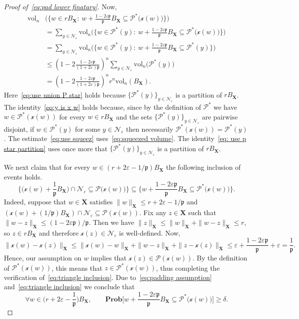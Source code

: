 \documentclass[11pt,reqno]{amsart}
\renewcommand{\le}{\leqslant}
\renewcommand{\ge}{\geqslant}
\renewcommand{\d}{\delta}
\newcommand{\X}{\mathbf X}
\newcommand{\e}{\varepsilon}
\theoremstyle{remark}
\renewcommand{\subset}{\subseteq}
\renewcommand{\Pr}{\mathbf{Prob}}
\newcommand{\vol}{\mathrm{vol}}
\renewcommand{\1}{\mathbf 1}
\newcommand{\Part}{\mathscr{P}}
\newcommand{\p}{\mathfrak{p}}
\newcommand{\cx}{\mathcal{x}}
\begin{document}
\begin{proof}[Proof of~\eqref{eq:pad lower finatary}]
Now,
\begin{align}
\vol_n&\Big(\Big\{w\in rB_{\X}:\ w+\frac{1-2\e{\mathfrak{p}}}{{\mathfrak{p}}}B_{\X}\subset \Part^*\big(\cx(w)\big)\Big\}\Big)\nonumber \\&=\sum_{y\in \mathcal{N}_\e}\vol_n\Big(\Big\{w\in \Part^*(y):\ w+\frac{1-2\e{\mathfrak{p}}}{{\mathfrak{p}}}B_{\X}\subset \Part^*\big(\cx(w)\big)\Big\}\Big)\label{eq:use union P star}\\
&=\sum_{y\in \mathcal{N}_\e}\vol_n\Big(\Big\{w\in \Part^*(y):\ w+\frac{1-2\e{\mathfrak{p}}}{{\mathfrak{p}}}B_{\X}\subset \Part^*(y)\Big\}\Big)\label{eq:y is x w}\\
&\le \left(1-2\frac{1-2\e{\mathfrak{p}}}{(1+2\e){\mathfrak{p}}}\right)^n\sum_{y\in \mathcal{N}_\e}\vol_n\big(\Part^*(y)\big)\label{eq:use squeez}\\
&=\left(1-2\frac{1-2\e{\mathfrak{p}}}{(1+2\e){\mathfrak{p}}}\right)^nr^n\vol_n(B_{\X}).\label{eq: use p star partition}
\end{align}
Here~\eqref{eq:use union P star} holds because  $\{\Part^*(y)\}_{y\in \mathcal{N}_\e}$ is a partition of $rB_{\X}$. The identity~\eqref{eq:y is x w} holds because, since by the definition of $\Part^*$ we have $w\in \Part^*(\cx(w))$ for every $w\in rB_{\X}$ and the sets $\{\Part^*(y)\}_{y\in \mathcal{N}_\e}$ are pairwise disjoint, if $w\in \Part^*(y)$ for some $y\in \mathcal{N}_\e$ then necessarily $\Part^*(\cx(w))=\Part^*(y)$. The estimate~\eqref{eq:use squeez} uses~\eqref{eq:squeezed volume}. The identity~\eqref{eq: use p star partition}  uses once more that  $\{\Part^*(y)\}_{y\in \mathcal{N}_\e}$ is a partition of $rB_{\X}$.

We next claim that for every $w\in (r+2\e-1/\p)B_{\X}$ the following inclusion of events holds.
\begin{equation}\label{eq:triangle inclusion}
 \bigg\{\Big(\cx(w)+\frac{1}{{\mathfrak{p}}}B_{\X}\Big)\cap \mathcal{N}_\e \subset\mathscr{P}\big(\cx(w)\big)\bigg\}\subset \bigg\{w+\frac{1-2\e{\mathfrak{p}}}{{\mathfrak{p}}}B_{\X}\subset \Part^*\big(\cx(w)\big)\bigg\}.
\end{equation}
Indeed, suppose that $w\in \X$ satisfies $\|w\|_{\X}\le r+2\e-1/{\mathfrak{p}}$ and $(\cx(w)+(1/\p)B_{\X})\cap \mathcal{N}_\e \subset\mathscr{P}(\cx(w))$. Fix any $z \in \X$ such that $\|w-z \|_{\X}\le (1-2\e\p)/\p$. Then we have $\|z \|_{\X}\le \|w\|_{\X}+\|w-z \|_{\X}\le r$, so $z \in rB_{\X}$ and therefore $\cx(z )\in \mathcal{N}_\e$ is well-defined. Now, $$\|\cx(w)-\cx(z )\|_{\X}\le \|\cx(w)-w\|_{\X}+\|w-z \|_{\X}+\|z -\cx(z )\|_{\X}\le \e+\frac{1-2\e{\mathfrak{p}}}{\p}+\e=\frac{1}{\p}.$$
Hence, our assumption on $w$ implies that $\cx(z )\in \Part(\cx(w))$. By the definition of $\Part^*(\cx(w))$, this means that $z \in \Part^*(\cx(w))$, thus completing the verification of~\eqref{eq:triangle inclusion}.  Due to~\eqref{eq:padding assumption} and~\eqref{eq:triangle inclusion} we conclude that
\begin{equation}\label{eq:padding for voronoi}
\forall  w\in \Big(r+2\e-\frac{1}{\mathfrak{p}}\Big)B_{\X},\qquad \Pr\Big[w+\frac{1-2\e{\mathfrak{p}}}{{\mathfrak{p}}}B_{\X}\subset \Part^*\big(\cx(w)\big)\Big]\ge \d.
\end{equation}



\end{proof}
\end{document}
